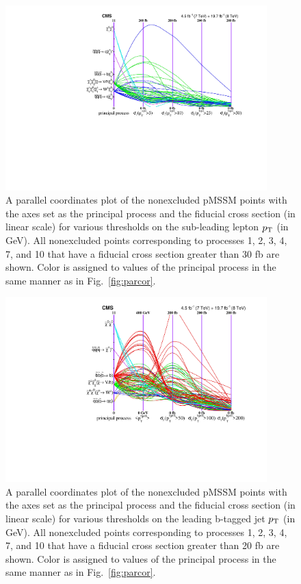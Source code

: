\begin{figure}[tb!]
  \centering
   \includegraphics[width=0.9\textwidth]{figures/pMSSMpaper/parallel_coordinates/ParCorToposLep2.pdf}
    \caption{A parallel coordinates plot of the nonexcluded pMSSM
      points with the axes set as the principal process and the 
    fiducial cross section (in linear scale) for various thresholds on the
    sub-leading lepton $p_{\rm T}$ (in GeV). All nonexcluded points corresponding to processes 1, 2, 3,
    4, 7, and 10 that have a fiducial cross section greater than 30 fb are shown. Color is
    assigned to values of the principal process in the same manner as
    in Fig.~\ref{fig:parcor}. } 
    \label{fig:parcorLEP2}
\end{figure}
\begin{figure}[tb!]
  \centering
   \includegraphics[width=0.9\textwidth]{figures/pMSSMpaper/parallel_coordinates/ParCorToposBjet1.pdf}
    \caption{A parallel coordinates plot of the nonexcluded pMSSM
      points with the axes set as the principal process and the 
    fiducial cross section (in linear scale) for various thresholds on the
    leading b-tagged jet $p_{\rm T}$ (in GeV). All nonexcluded points corresponding to processes 1, 2, 3,
    4, 7, and 10 that have a fiducial cross section greater than 20 fb are shown. Color is
    assigned to values of the principal process in the same manner as
    in Fig.~\ref{fig:parcor}. } 
    \label{fig:parcorBJet1}
\end{figure}

